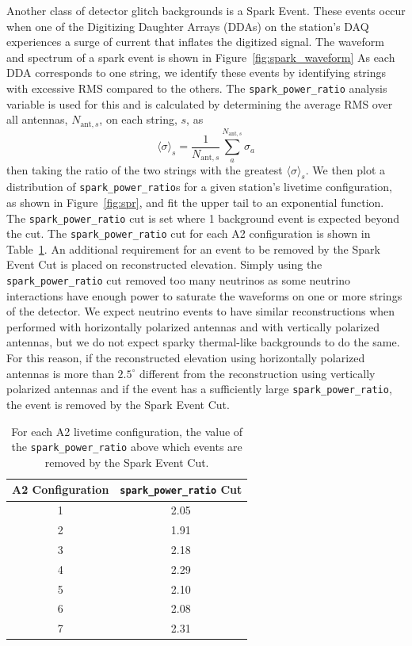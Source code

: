    Another class of detector glitch backgrounds is a Spark Event. 
    These events occur when one of the Digitizing Daughter Arrays (DDAs) on the station's DAQ experiences a surge of current that inflates the digitized signal.
    The waveform and spectrum of a spark event is shown in Figure~\ref{fig:spark_waveform}
    As each DDA corresponds to one string, we identify these events by identifying strings with excessive RMS compared to the others.
    The \texttt{spark\_power\_ratio} analysis variable is used for this and is calculated by determining the average RMS over all antennas, $N_{\text{ant}, s}$, on each string, $s$, as
    \begin{equation}
      \langle \sigma \rangle_s = \frac{1}{N_{\text{ant}, s}} \sum_a^{N_{\text{ant}, s}} \sigma_a
    \end{equation}
    then taking the ratio of the two strings with the greatest $\langle \sigma \rangle_s $.
    We then plot a distribution of \texttt{spark\_power\_ratio}s for a given station's livetime configuration, as shown in Figure~\ref{fig:spr}, and fit the upper tail to an exponential function.
    The \texttt{spark\_power\_ratio} cut is set where 1 background event is expected beyond the cut. 
    The \texttt{spark\_power\_ratio} cut for each A2 configuration is shown in Table~\ref{tab:spr}.
    An additional requirement for an event to be removed by the Spark Event Cut is placed on reconstructed elevation.
    Simply using the \texttt{spark\_power\_ratio} cut removed too many neutrinos as some neutrino interactions have enough power to saturate the waveforms on one or more strings of the detector.
    We expect neutrino events to have similar reconstructions when performed with horizontally polarized antennas and with vertically polarized antennas, but we do not expect sparky thermal-like backgrounds to do the same.
    For this reason, if the reconstructed elevation using horizontally polarized antennas is more than $2.5^{\circ}$ different from the reconstruction using vertically polarized antennas and if the event has a sufficiently large \texttt{spark\_power\_ratio}, the event is removed by the Spark Event Cut.

    \begin{table}
      \centering
      \begin{tabular}{|c|c|}
        \hline
        A2 Configuration & \texttt{spark\_power\_ratio} Cut \\
        \hline
        1 & 2.05 \\
        2 & 1.91 \\
        3 & 2.18 \\
        4 & 2.29 \\
        5 & 2.10 \\
        6 & 2.08 \\
        7 & 2.31 \\
        \hline
      \end{tabular}
      \caption{
        For each A2 livetime configuration, the value of the \texttt{spark\_power\_ratio} above which events are removed by the Spark Event Cut.
      }
      \label{tab:spr}
    \end{table}

